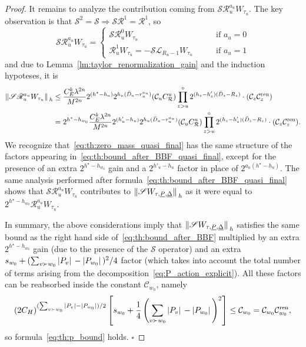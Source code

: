 \documentclass[a4paper, 11pt]{article}
\newcommand{\kloc}{\mathscr{L}}								%
\newcommand{\ren}{\mathcal{R}}								%
\newcommand{\kren}{\mathscr{R}}								%
\theoremstyle{thm}
\begin{document}
\begin{proof}
It remains to analyze the contribution coming from $\mathscr{S} \kren^{a_u}_u W_{\tau_u}$. The key observation is that $\mathscr{S}^2 = \mathscr{S} \Rightarrow \mathscr{S} \kren^1 = \kren^1$, so
\begin{equation}
\mathscr{S} \kren^{a_u}_u W_{\tau_u} =
\begin{cases}
\mathscr{S} \kren^0_u W_{\tau_u} 											& \qquad \text{if } a_u = 0 \\
\kren^1_u W_{\tau_u} = - \mathscr{S} \kloc_{R_u - 1} W_{\tau_u}		& \qquad \text{if } a_u = 1
\end{cases}
\end{equation}
and due to Lemma~\ref{lm:taylor_renormalization_gain} and the induction hypoteses, it is
\begin{align}
\label{eq:th:zero_mass_quasi_final}
\begin{split}
\norm*{\mathscr{S} \kren^{a_u}_u W_{\tau_u}}_h 
& \le \frac{C_E^k \lambda^{2n}}{M^{2n}} 2^{(h^\star - h_u)} 2^{h_u(\bar{D}_u - r^{a_u}_u)} (\mathcal{C}_u C_\ren^u) \prod_{z > u}^\circ 2^{(h_z - h'_z)(\bar{D}_z - R_z)} \cdot (\mathcal{C}_z \mathcal{C}^\textup{ren}_z) \\
& = 2^{h^\star - h_{w_0}} \frac{C_E^k \lambda^{2n}}{M^{2n}} 2^{(h'_u - h_u)} 2^{h_u(\bar{D}_u - r^{a_u}_u)} (\mathcal{C}_u C_\ren^u) \prod_{z > u}^\circ 2^{(h_z - h'_z)(\bar{D}_z - R_z)} \cdot (\mathcal{C}_z \mathcal{C}^\textup{ren}_z).
\end{split}
\end{align}
We recognize that~\eqref{eq:th:zero_mass_quasi_final} has the same structure of the factors appearing in~\eqref{eq:th:bound_after_BBF_quasi_final}, except for the presence of an extra $2^{h^\star - h_{w_0}}$ gain and a $2^{h'_u - h_u}$ factor in place of $2^{a_u(h^\star - h_u)}$. The same analysis performed after formula~\eqref{eq:th:bound_after_BBF_quasi_final} shows that $\mathscr{S} \kren_u^{a_u} W_{\tau_u}$ contributes to $\norm*{\mathscr{S} W_{\tau, \underline{P}, \underline{\Delta}}}_h$ as it were equal to $2^{h^\star - h_{w_0}} \kren^{a_u}_u W_{\tau_u}$.

In summary, the above considerations imply that $\norm*{\mathscr{S} W_{\tau, \underline{P}, \underline{\Delta}}}_h$ satisfies the same bound as the right hand side of~\eqref{eq:th:bound_after_BBF} multiplied by an extra $2^{h^\star - h_{w_0}}$ gain (due to the presence of the $\mathscr{S}$ operator) and an extra $s_{w_0} + (\sum_{v \succ w_0} \abs*{P_v} - \abs*{P_{w_0}})^2/4$ factor (which takes into account the total number of terms arising from the decomposition~\eqref{eq:P_action_explicit}). All these factors can be reabsorbed inside the constant $\mathcal{C}_{w_0}$, namely
\begin{equation}
(2C_H)^{(\sum_{v \succ w_0} \abs*{P_v} - \abs*{P_{w_0}})/2} \left[ s_{w_0} + \frac{1}{4} \left( \sum_{v \succ w_0} \abs*{P_v} - \abs*{P_{w_0}}  \right)^2 \right] \le \mathcal{C}_{w_0} = \mathcal{C}_{w_0} \mathcal{C}_{w_0}^{\textup{ren}},
\end{equation}
so formula~\eqref{eq:th:p_bound} holds. $\square$


\end{proof}
\end{document}
